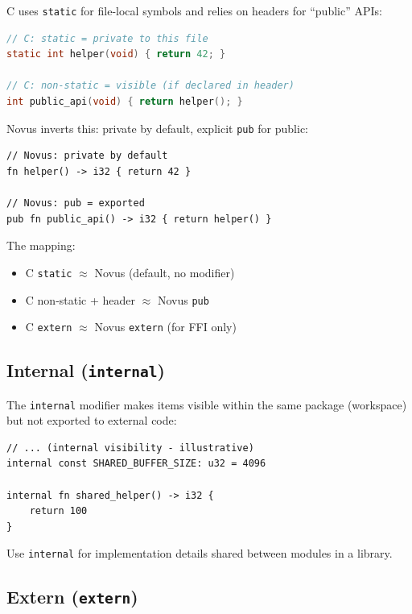 \begin{comingfromc}
C uses \texttt{static} for file-local symbols and relies on headers for ``public'' APIs:

\begin{lstlisting}[language=C]
// C: static = private to this file
static int helper(void) { return 42; }

// C: non-static = visible (if declared in header)
int public_api(void) { return helper(); }
\end{lstlisting}

Novus inverts this: private by default, explicit \texttt{pub} for public:

\begin{lstlisting}
// Novus: private by default
fn helper() -> i32 { return 42 }

// Novus: pub = exported
pub fn public_api() -> i32 { return helper() }
\end{lstlisting}

The mapping:
\begin{itemize}
    \item C \texttt{static} $\approx$ Novus (default, no modifier)
    \item C non-static + header $\approx$ Novus \texttt{pub}
    \item C \texttt{extern} $\approx$ Novus \texttt{extern} (for FFI only)
\end{itemize}
\end{comingfromc}

\subsection{Internal (\texttt{internal})}
\label{subsec:internal}

The \texttt{internal} modifier makes items visible within the same package (workspace) but not exported to external code:

\begin{lstlisting}
// ... (internal visibility - illustrative)
internal const SHARED_BUFFER_SIZE: u32 = 4096

internal fn shared_helper() -> i32 {
    return 100
}
\end{lstlisting}

Use \texttt{internal} for implementation details shared between modules in a library.

\subsection{Extern (\texttt{extern})}
\label{subsec:extern}

